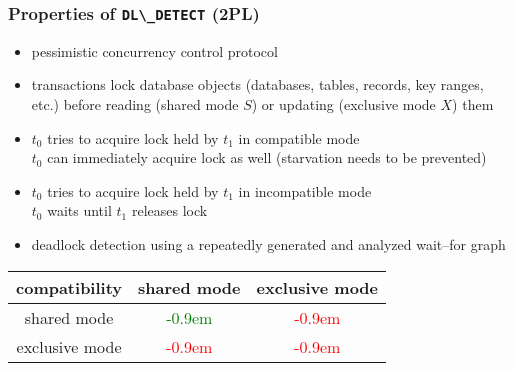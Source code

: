 \begin{frame}
	\frametitle{Properties of \lstinline{DL\_DETECT} (2PL)}
	
	\begin{itemize}
		\item	pessimistic concurrency control protocol
		\item	transactions lock database objects (databases, tables, records, key ranges, etc.) before reading (shared mode $S$) or updating (exclusive mode $X$) them	\cite{Mohan:1990}
		\item	$t_0$ tries to acquire lock held by $t_1$ in compatible mode \\ \bm{$\rightarrow$} $t_0$ can immediately acquire lock as well (starvation needs to be prevented)
		\item	$t_0$ tries to acquire lock held by $t_1$ in incompatible mode \\ \bm{$\rightarrow$} $t_0$ waits until $t_1$ releases lock
		\item	deadlock detection using a repeatedly generated and analyzed wait--for graph
	\end{itemize}
	\newcommand{\plus}{\textcolor{green!15}{\LARGE\raisebox{-.0875em}{\bm{$\bullet$}}}\textcolor{green}{\kern-0.9em\bm{$\oplus$}}}
	\newcommand{\minus}{\textcolor{red!25}{\LARGE\raisebox{-.0875em}{\bm{$\bullet$}}}\textcolor{red}{\kern-0.9em\bm{$\ominus$}}}
	
	\centering
	\begin{tabular}{| c | c | c |}
															\hline
		compatibility	&	shared mode	&	exclusive mode		\\	\hline
		shared mode	&	\plus			&	\minus			\\	\hline
		exclusive mode	&	\minus		&	\minus			\\	\hline
	\end{tabular}%
\end{frame}

